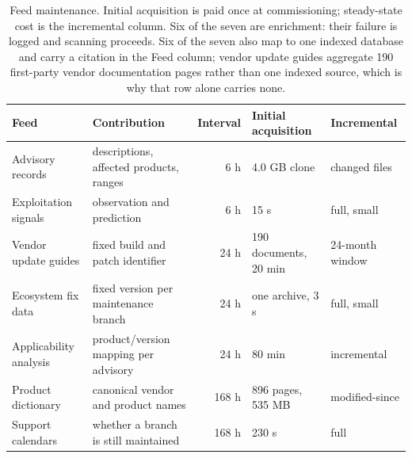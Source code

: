 \begin{table}[htbp]
\centering
\caption{Feed maintenance. Initial acquisition is paid once at commissioning; steady-state cost is the incremental column. Six of the seven are enrichment: their failure is logged and scanning proceeds. Six of the seven also map to one indexed database and carry a citation in the Feed column; vendor update guides aggregate 190 first-party vendor documentation pages rather than one indexed source, which is why that row alone carries none.}
\label{tab:feeds}
\footnotesize
\begin{tabular}{@{}p{3.4cm}p{2.6cm}rp{2.8cm}p{2.0cm}@{}}
\hline
\textbf{Feed} & \textbf{Contribution} & \textbf{Interval} & \textbf{Initial acquisition} & \textbf{Incremental} \\
\hline\hline
Advisory records~\cite{cvelist} & descriptions, affected products, ranges & 6 h & 4.0 GB clone & changed files \\
\rowcolor{tblstripe} Exploitation signals~\cite{kev,epss} & observation and prediction & 6 h & 15 s & full, small \\
Vendor update guides & fixed build and patch identifier & 24 h & 190 documents, 20 min & 24-month window \\
\rowcolor{tblstripe} Ecosystem fix data~\cite{osv} & fixed version per maintenance branch & 24 h & one archive, 3 s & full, small \\
Applicability analysis~\cite{nvd} & product/version mapping per advisory & 24 h & 80 min & incremental \\
\rowcolor{tblstripe} Product dictionary~\cite{cpe} & canonical vendor and product names & 168 h & 896 pages, 535 MB & modified-since \\
Support calendars~\cite{endoflife} & whether a branch is still maintained & 168 h & 230 s & full \\
\hline
\end{tabular}
\end{table}
